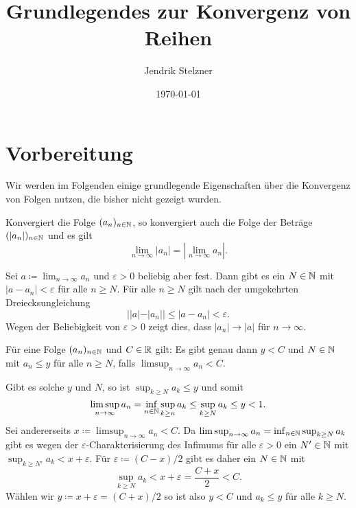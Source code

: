 \documentclass[a4paper,10pt]{article}
\title{Grundlegendes zur Konvergenz von Reihen}
\author{Jendrik Stelzner}
\date{\today}
\begin{document}
\maketitle

\tableofcontents





\section{Vorbereitung}


Wir werden im Folgenden einige grundlegende Eigenschaften über die Konvergenz von Folgen nutzen, die bisher nicht gezeigt wurden.


\begin{question}
 Konvergiert die Folge $(a_n)_{n \in \mathbb{N}}$, so konvergiert auch die Folge der Beträge $(|a_n|)_{n \in \mathbb{N}}$ und es gilt
 \[
  \lim_{n \to \infty} |a_n| = \left| \lim_{n \to \infty} a_n \right|.
 \]
\end{question}
\begin{solution}
 Sei $a \coloneqq \lim_{n \to \infty} a_n$ und $\varepsilon > 0$ beliebig aber fest. Dann gibt es ein $N \in \mathbb{N}$ mit $|a - a_n| < \varepsilon$ für alle $n \geq N$. Für alle $n \geq N$ gilt nach der umgekehrten Dreiecksungleichung
 \[
  ||a| - |a_n|| \leq |a - a_n| < \varepsilon.
 \]
 Wegen der Beliebigkeit von $\varepsilon > 0$ zeigt dies, dass $|a_n| \to |a|$ für $n \to \infty$.
\end{solution}


\begin{question}
 Für eine Folge $(a_n)_{n \in \mathbb{N}}$ und $C \in \mathbb{R}$ gilt: Es gibt genau dann $y < C$ und $N \in \mathbb{N}$ mit $a_n \leq y$ für alle $n \geq N$, falls $\limsup_{n \to \infty} a_n < C$.
\end{question}
\begin{solution}
 Gibt es solche $y$ und $N$, so ist $\sup_{k \geq N} a_k \leq y$ und somit
 \[
  \limsup_{n \to \infty} a_n
  = \inf_{n \in \mathbb{N}} \sup_{k \geq n} a_k
  \leq \sup_{k \geq N} a_k
  \leq y
  < 1.
 \]
 Sei andererseits $x \coloneqq \limsup_{n \to \infty} a_n < C$. Da $\limsup_{n \to \infty} a_n = \inf_{n \in \mathbb{N}} \sup_{k \geq N} a_k$ gibt es wegen der $\varepsilon$-Charakterisierung des Infimums für alle $\varepsilon > 0$ ein $N' \in \mathbb{N}$ mit $\sup_{k \geq N'} a_k < x + \varepsilon$. Für $\varepsilon \coloneqq (C-x)/2$ gibt es daher ein $N \in \mathbb{N}$ mit
 \[
  \sup_{k \geq N} a_k < x + \varepsilon = \frac{C + x}{2} < C.
 \]
 Wählen wir $y \coloneqq x + \varepsilon = (C+x)/2$ so ist also $y < C$ und $a_k \leq y$ für alle $k \geq N$.
\end{solution}
\end{document}
